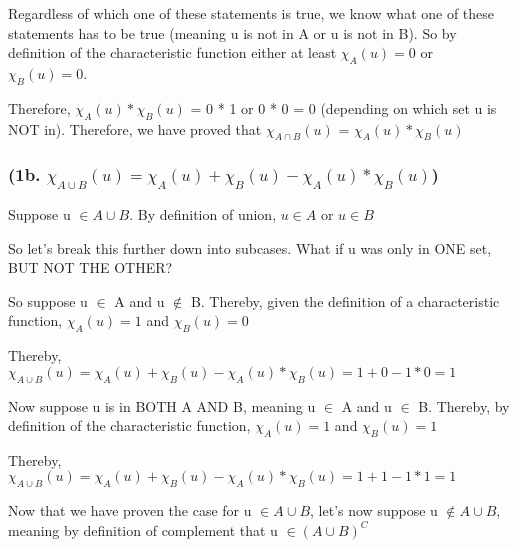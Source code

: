 \documentclass{article}
\begin{document}
\noindent Regardless of which one of these statements is true, we know what one of these statements has to be true (meaning u is not in A or u is not in B).  So by definition of the characteristic function either at least $\chi_{A}(u) = 0$ or $\chi_{B}(u) = 0$. \par\vspace{0.5cm}

\noindent Therefore, $\chi_{A}(u) * \chi_{B}(u)$ = 0 * 1 or 0 * 0 = 0 (depending on which set u is NOT in).  Therefore, we have proved that $\chi_{A\cap B}(u)$ = $\chi_{A}(u) * \chi_{B}(u)$

\subsubsection{(1b. $\chi_{A\cup B}(u) = \chi_{A}(u) + \chi_{B}(u) - \chi_{A}(u) * \chi_{B}(u)$)}

\noindent Suppose u $\in A \cup B$.  By definition of union, $u \in A$ or $u \in B$ \par\vspace{0.5cm}

\noindent So let's break this further down into subcases.  What if u was only in ONE set, BUT NOT THE OTHER? \par\vspace{0.5cm}

\noindent So suppose u $\in$ A and u $\notin$ B.  Thereby, given the definition of a characteristic function, $\chi_{A}(u) = 1$ and $\chi_{B}(u) = 0$ \par\vspace{0.5cm}

\noindent Thereby, $\chi_{A\cup B}(u) = \chi_{A}(u) + \chi_{B}(u) - \chi_{A}(u) * \chi_{B}(u) = 1 + 0 - 1 * 0 = 1$  \par\vspace{0.5cm}

\noindent Now suppose u is in BOTH A AND B, meaning u $\in$ A and u $\in$ B.  Thereby, by definition of the characteristic function, $\chi_{A}(u) = 1$ and $\chi_{B}(u) = 1$\par\vspace{0.5cm}

\noindent Thereby, $\chi_{A\cup B}(u) = \chi_{A}(u) + \chi_{B}(u) - \chi_{A}(u) * \chi_{B}(u) = 1 + 1 - 1 * 1 = 1$  \par\vspace{0.5cm}

\noindent Now that we have proven the case for u $\in A \cup B$, let's now suppose u $\notin A \cup B$, meaning by definition of complement that u $\in (A \cup B)^{C}$ \par\vspace{0.5cm}
\end{document}
